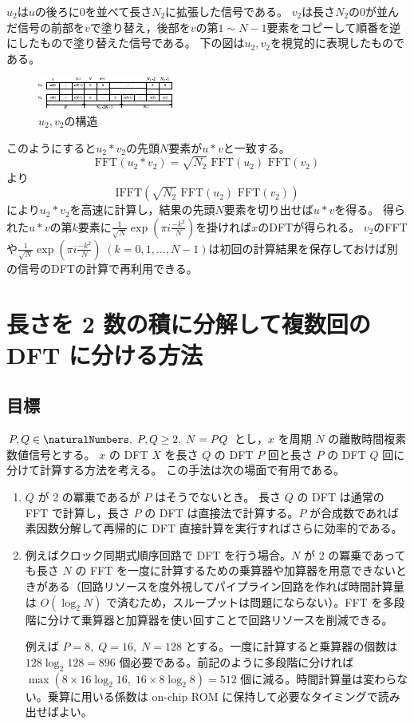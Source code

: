         $u_2$は$u$の後ろに$0$を並べて長さ$N_2$に拡張した信号である。
        $v_2$は長さ$N_2$の$0$が並んだ信号の前部を$v$で塗り替え，後部を$v$の第$1\sim N-1$要素をコピーして順番を逆にしたもので塗り替えた信号である。
        下の図は$u_2,v_2$を視覚的に表現したものである。
        \begin{figure}[H]
            \centering
            \includegraphics[keepaspectratio, scale=4]
            {parts/FourierSeries_and_FourierTransform/figs/FFT/arbitraryLengthFFT_to_powerOf2_FFT/u2,v2.pdf}
            \caption{$u_2,v_2$の構造}
        \end{figure}
        このようにすると$u_2*v_2$の先頭$N$要素が$u*v$と一致する。
        \[ \text{FFT}(u_2*v_2) = \sqrt{N_2}\text{ FFT}(u_2) \text{ FFT}(v_2) \]
        より
        \[ \text{IFFT}(\sqrt{N_2}\text{ FFT}(u_2) \text{ FFT}(v_2)) \]
        により$u_2*v_2$を高速に計算し，結果の先頭$N$要素を切り出せば$u*v$を得る。
        得られた$u*v$の第$k$要素に$\frac{1}{\sqrt{N}} \exp \left(\pi i\frac{-k^2}{N}\right)$を掛ければ$x$のDFTが得られる。
        $v_2$のFFTや$\frac{1}{\sqrt{N}} \exp \left(\pi i\frac{-k^2}{N}\right) \;(k=0,1,\dots,N-1)$は初回の計算結果を保存しておけば別の信号のDFTの計算で再利用できる。
    \section{長さを 2 数の積に分解して複数回の DFT に分ける方法}
        \subsection{目標}
            $P,Q\in\naturalNumbers,\;P,Q\geq 2,\;N = PQ$ とし，$x$ を周期 $N$ の離散時間複素数値信号とする。
            $x$ の DFT $X$ を長さ $Q$ の DFT $P$ 回と長さ $P$ の DFT $Q$ 回に分けて計算する方法を考える。
            この手法は次の場面で有用である。
            \begin{enumerate}
                \item $Q$ が 2 の冪乗であるが $P$ はそうでないとき。 長さ $Q$ の DFT は通常の FFT で計算し，長さ $P$ の DFT は直接法で計算する。$P$ が合成数であれば素因数分解して再帰的に DFT 直接計算を実行すればさらに効率的である。
                \item 例えばクロック同期式順序回路で DFT を行う場合。$N$ が 2 の冪乗であっても長さ $N$ の FFT を一度に計算するための乗算器や加算器を用意できないときがある（回路リソースを度外視してパイプライン回路を作れば時間計算量は $O(\log_2 N)$ で済むため，スループットは問題にならない）。FFT を多段階に分けて乗算器と加算器を使い回すことで回路リソースを削減できる。
                \par
                例えば $P=8,\;Q=16,\;N=128$ とする。一度に計算すると乗算器の個数は $128\log_2 128 = 896$ 個必要である。前記のように多段階に分ければ $\max(8\times 16\log_2 16,\;16\times 8\log_2 8) = 512$ 個に減る。時間計算量は変わらない。乗算に用いる係数は on-chip ROM に保持して必要なタイミングで読み出せばよい。
            \end{enumerate}
